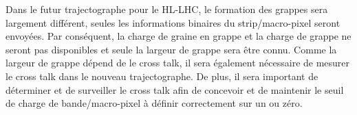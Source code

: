 
Dans le futur trajectographe pour le HL-LHC, le formation des grappes sera largement différent, seules les informations binaires du strip/macro-pixel seront envoyées. Par conséquent, la charge de graine en grappe et la charge de grappe ne seront pas disponibles et seule la largeur de grappe sera être connu. Comme la largeur de grappe dépend de le cross talk, il sera également nécessaire de mesurer le cross talk dans le nouveau trajectographe. De plus, il sera important de déterminer et de surveiller le cross talk afin de concevoir et de maintenir le seuil de charge de bande/macro-pixel à définir correctement sur un ou zéro.

\vspace*{1cm}


